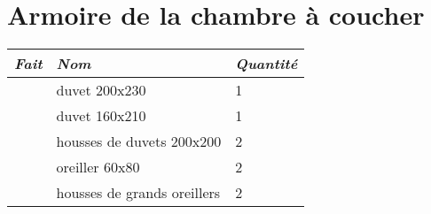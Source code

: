 \documentclass[french]{article}
\begin{document}
\section{Armoire de la chambre à coucher}

\begin{tabular}{|l|l|l|}
	\hline
	\emph{Fait} & \emph{Nom} & \emph{Quantit\'e} \\
	\hline
	& duvet 200x230 & 1 \\ \hline
	& duvet 160x210 & 1 \\ \hline
	& housses de duvets 200x200 & 2 \\ \hline
	& oreiller  60x80 &  2 \\ \hline
	& housses de grands oreillers & 2 \\ \hline
\end{tabular}



	
	
\end{document}
